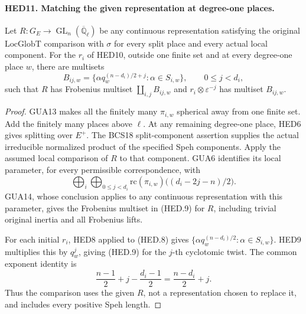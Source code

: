 \documentclass[11pt,a4paper]{article}
\numberwithin{equation}{section}
\theoremstyle{remark}\newtheorem{remark}[theorem]{Remark}
\begin{document}
\paragraph{HED11. Matching the given representation at degree-one places.}
\label{claim:HED11}
Let \(R:G_E\to\operatorname{GL}_n(\overline{\mathbb Q}_\ell)\)
be any continuous representation satisfying the original
\(\mathrm{LocGlobT}\) comparison with \(\sigma\) for every split
place and every actual local component.  For the \(r_i\) of HED10,
outside one finite set and at every degree-one place \(w\), there
are multisets
\[
 B_{ij,w}=\{\alpha q_w^{(n-d_i)/2+j}:\alpha\in S_{i,w}\},
                       \qquad 0\leq j<d_i,
 \tag{HED.9}
\]
such that \(R\) has Frobenius multiset \(\coprod_{i,j}B_{ij,w}\)
and \(r_i\otimes\varepsilon^{-j}\) has multiset \(B_{ij,w}\).
\begin{proof}
GUA13 makes all the finitely many \(\pi_{i,w}\) spherical away
from one finite set.  Add the finitely many places above \(\ell\).
At any remaining degree-one place, HED6 gives splitting over
\(E^+\).  The BCS18 split-component assertion supplies the actual
irreducible normalized product of the specified Speh components.
Apply the assumed local comparison of \(R\) to that component.
GUA6 identifies its local parameter, for every permissible
correspondence, with
\[
 \bigoplus_i\bigoplus_{0\leq j<d_i}
       \mathrm{rc}(\pi_{i,w})\bigl((d_i-2j-n)/2\bigr).
\]
GUA14, whose conclusion applies to any continuous representation
with this parameter, gives the Frobenius multiset in (HED.9) for
\(R\), including trivial original inertia and all Frobenius lifts.

For each initial \(r_i\), HED8 applied to (HED.8) gives
\(\{\alpha q_w^{(n-d_i)/2}:\alpha\in S_{i,w}\}\).
HED9 multiplies this by \(q_w^j\), giving (HED.9) for the
\(j\)-th cyclotomic twist.  The common exponent identity is
\[
 \frac{n-1}{2}+j-\frac{d_i-1}{2}
                          =\frac{n-d_i}{2}+j.
\]
Thus the comparison uses the given \(R\), not a representation
chosen to replace it, and includes every positive Speh length.
\end{proof}

\end{document}
